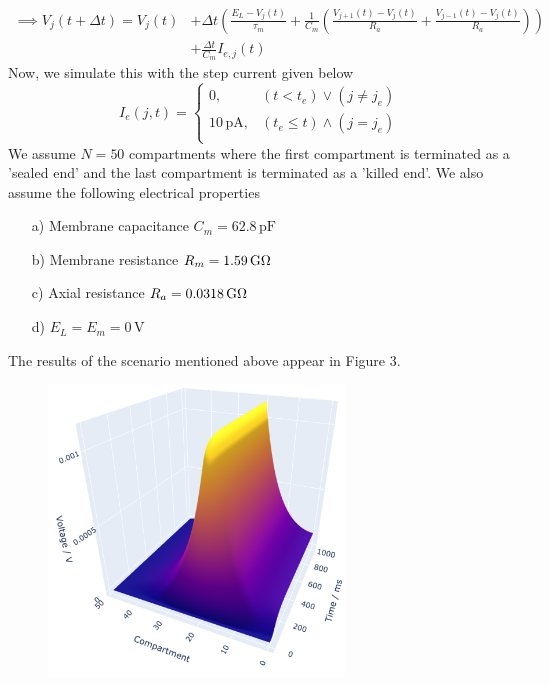 \documentclass[12pt]{article}
\begin{document}
\begin{enumerate}
\begin{align*}
    \end{align*}
    \begin{align*}
        \implies V_{j}(t + \Delta t) = V_{j}(t) &+ \Delta t \left( \frac{E_{L} - V_{j}(t)}{\tau_{m}} + \frac{1}{C_{m}} \left( \frac{V_{j+1}(t) - V_{j}(t)}{R_{a}} + \frac{V_{j-1}(t) - V_{j}(t)}{R_{a}}\right) \right)\\
        &+ \frac{\Delta t}{C_{m}}I_{e, j}(t)
    \end{align*}
    Now, we simulate this with the step current given below 
    \begin{equation} \label{eq1}
    I_{e}(j, t)= 
        \begin{cases}
            0, & (t < t_{e}) \vee (j \neq j_{e})\\
            10 \, \text{pA} ,              & (t_{e} \leqslant t) \wedge (j = j_{e})\\
        \end{cases}
    \end{equation}
    We assume $N = 50$ compartments where the first compartment is terminated as a 'sealed end' 
    and the last compartment is terminated as a 'killed end'. We also assume the following electrical properties
    \begin{enumerate}
        \item[a)] Membrane capacitance $C_{m} = 62.8 \, \text{pF}$
        \item[b)] Membrane resistance $R_{m} = 1.59 \, \text{G\si{\ohm}}$
        \item[c)] Axial resistance $R_{a} = 0.0318 \, \text{G\si{\ohm}}$
        \item[d)] $E_{L} = E_{m} = 0 \, \text{V}$
    \end{enumerate}
    The results of the scenario mentioned above appear in Figure 3.
    \begin{figure}[h]
        \centering
        \includegraphics[width=0.7\textwidth]{Figures/fig1_3d.png}

\end{figure}
\end{enumerate}
\end{document}
